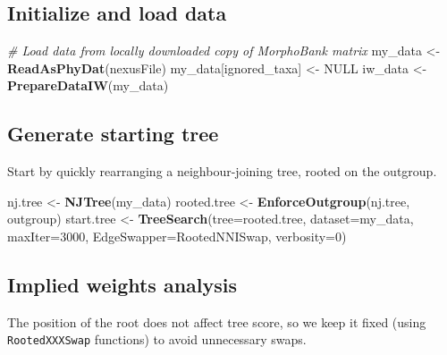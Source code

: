 \documentclass[openany]{book}
\newenvironment{Shaded}{\begin{snugshade}}{\end{snugshade}}
\newcommand{\KeywordTok}[1]{\textcolor[rgb]{0.13,0.29,0.53}{\textbf{#1}}}
\newcommand{\DataTypeTok}[1]{\textcolor[rgb]{0.13,0.29,0.53}{#1}}
\newcommand{\DecValTok}[1]{\textcolor[rgb]{0.00,0.00,0.81}{#1}}
\newcommand{\StringTok}[1]{\textcolor[rgb]{0.31,0.60,0.02}{#1}}
\newcommand{\CommentTok}[1]{\textcolor[rgb]{0.56,0.35,0.01}{\textit{#1}}}
\newcommand{\OtherTok}[1]{\textcolor[rgb]{0.56,0.35,0.01}{#1}}
\newcommand{\NormalTok}[1]{#1}
\begin{document}
\subsection{Initialize and load data}\label{initialize-and-load-data}

\begin{Shaded}
\begin{Highlighting}[]
\CommentTok{# Load data from locally downloaded copy of MorphoBank matrix}
\NormalTok{my_data <-}\StringTok{ }\KeywordTok{ReadAsPhyDat}\NormalTok{(nexusFile)}
\NormalTok{my_data[ignored_taxa] <-}\StringTok{ }\OtherTok{NULL}
\NormalTok{iw_data <-}\StringTok{ }\KeywordTok{PrepareDataIW}\NormalTok{(my_data)}
\end{Highlighting}
\end{Shaded}

\subsection{Generate starting tree}\label{generate-starting-tree}

Start by quickly rearranging a neighbour-joining tree, rooted on the
outgroup.

\begin{Shaded}
\begin{Highlighting}[]
\NormalTok{nj.tree <-}\StringTok{ }\KeywordTok{NJTree}\NormalTok{(my_data)}
\NormalTok{rooted.tree <-}\StringTok{ }\KeywordTok{EnforceOutgroup}\NormalTok{(nj.tree, outgroup)}
\NormalTok{start.tree <-}\StringTok{ }\KeywordTok{TreeSearch}\NormalTok{(}\DataTypeTok{tree=}\NormalTok{rooted.tree, }\DataTypeTok{dataset=}\NormalTok{my_data, }\DataTypeTok{maxIter=}\DecValTok{3000}\NormalTok{,}
                         \DataTypeTok{EdgeSwapper=}\NormalTok{RootedNNISwap, }\DataTypeTok{verbosity=}\DecValTok{0}\NormalTok{)}
\end{Highlighting}
\end{Shaded}

\subsection{Implied weights analysis}\label{implied-weights-analysis}

The position of the root does not affect tree score, so we keep it fixed
(using \texttt{RootedXXXSwap} functions) to avoid unnecessary swaps.
\end{document}
